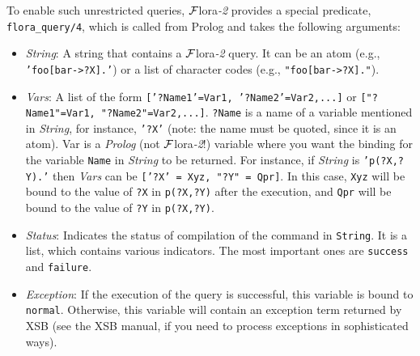 \documentclass[11pt]{article}
\newcommand{\FLORA}{{\mbox{\sc ${\cal F}${lora}\rm\emph{-2}}}\xspace}
\begin{document}
To enable such unrestricted queries, \FLORA provides a special predicate,
{\tt flora\_query/4}, which is called from Prolog
and takes the following arguments: 
\begin{itemize}
  \item  \emph{String}: A string that contains a \FLORA query. It can be an
    atom (e.g., {\tt 'foo[bar->?X].'}) or a list of character codes (e.g.,
    {\tt "foo[bar->?X]."}).
  \item \emph{Vars}: A list of the form {\tt ['?Name1'=Var1,
      '?Name2'=Var2,...]} or
    {\tt ["?Name1"=Var1, "?Name2"=Var2,...]}.
    {\tt ?Name} is a name of a variable mentioned in \emph{String}, for
    instance, {\tt '?X'} (note: the name must be quoted, since it is an
    atom).  Var is a \emph{Prolog} (not \FLORA!)
    variable where you want the binding for the variable
    {\tt Name} in \emph{String} to be returned.  For instance, if
    \emph{String} is {\tt 'p(?X,?Y).'} then \emph{Vars} can be {\tt ['?X' =
      Xyz, "?Y" = Qpr]}. In this case, {\tt Xyz} will be bound to the value
    of {\tt ?X} in {\tt p(?X,?Y)} after the execution, and {\tt Qpr} will be
    bound to the value of {\tt ?Y} in {\tt p(?X,?Y)}.
  \item \emph{Status}: Indicates the status of compilation of the command
    in {\tt String}.  It is a list, which contains various indicators.
    The most important ones are {\tt success} and {\tt failure}.
  \item \emph{Exception}: If the execution of the query is successful, this
    variable is bound to {\tt normal}. Otherwise, this variable will
    contain an exception term returned by XSB (see the XSB manual, if you
    need to process exceptions in sophisticated ways).
\end{itemize}
\end{document}
